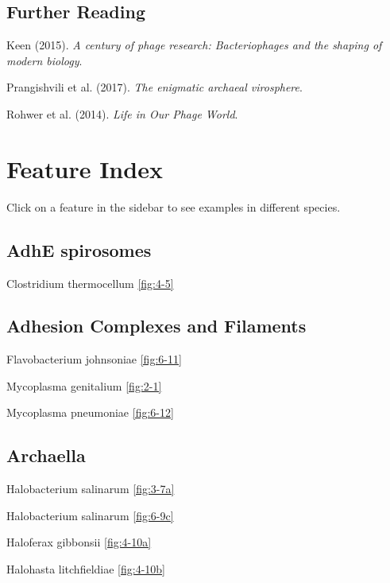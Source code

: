 \documentclass[]{tufte-book}
\begin{document}
\section{Further Reading}\label{further-reading}

Keen (2015). \emph{A century of phage research: Bacteriophages and the
shaping of modern biology}.\citep{keen2015}

Prangishvili et al. (2017). \emph{The enigmatic archaeal
virosphere}.\citep{prangishvili2017}

Rohwer et al. (2014). \emph{Life in Our Phage World}.\citep{rohwer2014}

\appendix


\chapter{Feature Index}\label{feature-index}

Click on a feature in the sidebar to see examples in different species.

\section*{AdhE spirosomes}\label{adhe-spirosomes}

Clostridium thermocellum \ref{fig:4-5}

\section*{Adhesion Complexes and
Filaments}\label{adhesion-complexes-and-filaments}

Flavobacterium johnsoniae \ref{fig:6-11}

Mycoplasma genitalium \ref{fig:2-1}

Mycoplasma pneumoniae \ref{fig:6-12}

\section*{Archaella}\label{archaella}

Halobacterium salinarum \ref{fig:3-7a}

Halobacterium salinarum \ref{fig:6-9c}

Haloferax gibbonsii \ref{fig:4-10a}

Halohasta litchfieldiae \ref{fig:4-10b}
\end{document}
